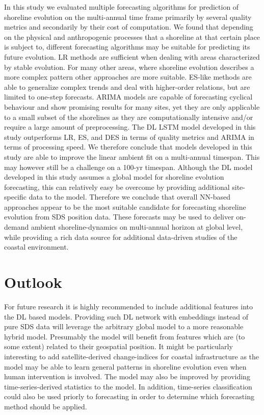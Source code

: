 \documentclass[format=sigconf, review=false, screen=true]{acmart}
\begin{document}
In this study we evaluated multiple forecasting algorithms for prediction of shoreline evolution on the multi-annual time frame primarily by several quality metrics and secondarily by their cost of computation. We found that depending on the physical and anthropogenic processes that a shoreline at that certain place is subject to, different forecasting algorithms may be suitable for predicting its future evolution. LR methods are sufficient when dealing with areas characterized by stable evolution. For many other areas, where shoreline evolution describes a more complex pattern other approaches are more suitable. ES-like methods are able to generalize complex trends and deal with higher-order relations, but are limited to one-step forecasts. ARIMA models are capable of forecasting cyclical behaviour and show promising results for many sites, yet they are only applicable to a small subset of the shorelines as they are computationally intensive and/or require a large amount of preprocessing. The DL LSTM model developed in this study outperforms LR, ES, and DES in terms of quality metrics and ARIMA in terms of processing speed. We therefore conclude that models developed in this study are able to improve the linear ambient fit on a multi-annual timespan. This may however still be a challenge on a 100-yr timespan. Although the DL model developed in this study assumes a global model for shoreline evolution forecasting, this can relatively easy be overcome by providing additional site-specific data to the model. Therefore we conclude that overall NN-based approaches appear to be the most suitable candidate for forecasting shoreline evolution from SDS position data. These forecasts may be used to deliver on-demand ambient shoreline-dynamics on multi-annual horizon at global level, while providing a rich data source for additional data-driven studies of the coastal environment.  


\section{Outlook}

For future research it is highly recommended to include additional features into the DL based models. Providing such DL network with embeddings instead of pure SDS data will leverage the arbitrary global model to a more reasonable hybrid model. Presumably the model will benefit from features which are (to some extent) related to their geospatial position. It might be particularly interesting to add satellite-derived change-indices for coastal infrastructure as the model may be able to learn general patterns in shoreline evolution even when human intervention is involved. The model may also be improved by providing time-series-derived statistics to the model. In addition, time-series classification could also be used priorly to forecasting in order to determine which forecasting method should be applied. 
\end{document}
